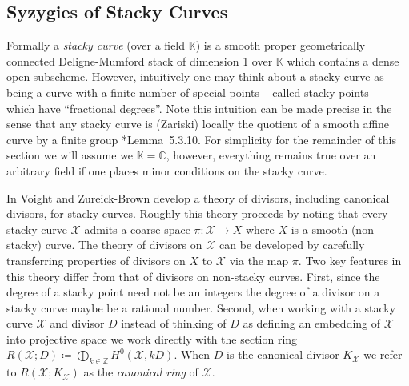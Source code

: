 \documentclass[11pt,reqno]{amsart}
\newtheorem{question}[lemma]{Question}
\theoremstyle{remark}
\newcommand{\cX}{\mathcal{X}}
\newcommand{\C}{\mathbb{C}}
\newcommand{\K}{\mathbb{K}}
\newcommand{\Z}{\mathbb{Z}}
\newcommand{\juliette}[1]{{\color{red} \sf $\spadesuit\spadesuit\spadesuit$ Juliette: [#1]}}
\begin{document}
%



\subsection{Syzygies of Stacky Curves}



Formally a \textit{stacky curve} (over a field $\K$) is a smooth proper geometrically connected Deligne-Mumford stack of dimension 1 over $\K$ which contains a dense open subscheme. However, intuitively one may think about a stacky curve as being a curve with a finite number of special points -- called stacky points -- which have ``fractional degrees''. Note this intuition can be made precise in the sense that any stacky curve is (Zariski) locally the quotient of a smooth affine curve by a finite group \cite{voightZurieckBrown22}*{Lemma~5.3.10}. For simplicity for the remainder of this section we will assume we $\K=\C$, however, everything remains true over an arbitrary field if one places minor conditions on the stacky curve. 

In \cite{voightZurieckBrown22} Voight and Zureick-Brown develop a theory of divisors, including canonical divisors, for stacky curves. Roughly this theory proceeds by noting that every stacky curve $\cX$ admits a coarse space $\pi:\cX\to X$ where $X$ is a smooth (non-stacky) curve. The theory of divisors on $\cX$ can be developed by carefully transferring properties of divisors on $X$ to $\cX$ via the map $\pi$. Two key features in this theory differ from that of divisors on non-stacky curves. First, since the degree of a stacky point need not be an integers the degree of a divisor on a stacky curve maybe be a rational number. Second, when working with a stacky curve $\cX$ and divisor $D$ instead of thinking of $D$ as defining an embedding of $\cX$ into projective space we work directly with the section ring $R(\cX;D)\coloneqq \bigoplus_{k\in \Z}H^{0}(\cX,kD)$. When $D$ is the canonical divisor $K_{\cX}$ we refer to $R(\cX;K_{\cX})$ as the \textit{canonical ring} of $\cX$.
\end{document}
